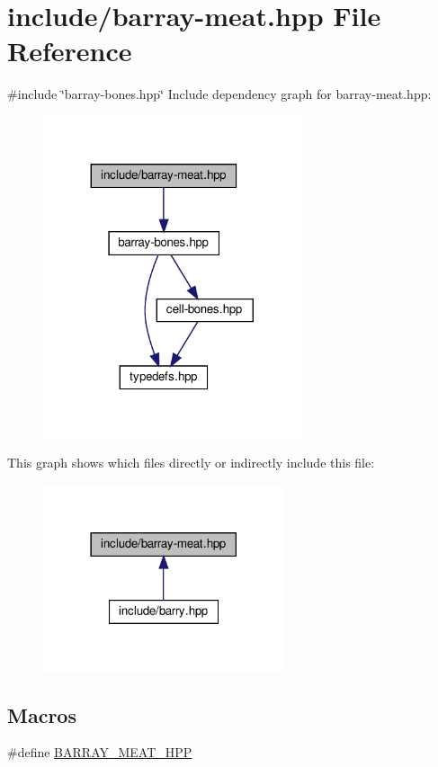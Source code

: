 \hypertarget{barray-meat_8hpp}{}\section{include/barray-\/meat.hpp File Reference}
\label{barray-meat_8hpp}
{\ttfamily \#include \char`\"{}barray-\/bones.\+hpp\char`\"{}}\newline
Include dependency graph for barray-\/meat.hpp\+:\nopagebreak
\begin{figure}[H]
\begin{center}
\leavevmode
\includegraphics[width=215pt]{barray-meat_8hpp__incl}
\end{center}
\end{figure}
This graph shows which files directly or indirectly include this file\+:\nopagebreak
\begin{figure}[H]
\begin{center}
\leavevmode
\includegraphics[width=201pt]{barray-meat_8hpp__dep__incl}
\end{center}
\end{figure}
\subsection*{Macros}
\begin{DoxyCompactItemize}
\item 
\#define \hyperlink{barry_8hpp_abfe11a04b2bd2b5c4493824232f61731}{B\+A\+R\+R\+A\+Y\+\_\+\+M\+E\+A\+T\+\_\+\+H\+PP}
\end{DoxyCompactItemize}


